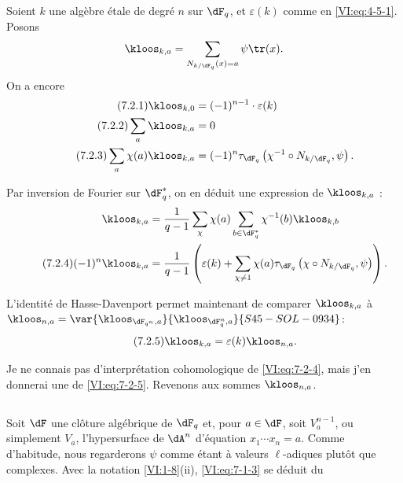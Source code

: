 Soient $k$ une algèbre étale de degré $n$ sur $\dF_q$, et $\varepsilon(k)$ 
comme en \eqref{VI:eq:4-5-1}. Posons 
\[
  \kloos_{k,a} = \sum_{N_{k/\dF_q}(x)=a} \psi \tr(x) \text{.} 
\]
On a encore 
\begin{align*}\tag{7.2.1}\label{VI:eq:7-2-1}
  \kloos_{k,0} &= (-1)^{n-1} \cdot \varepsilon(k) \\ \tag{7.2.2}\label{VI:eq:7-2-2}
  \sum_a \kloos_{k,a} &= 0 \\ \tag{7.2.3}\label{VI:eq:7-2-3}
  \sum_a \chi(a) \kloos_{k,a} &= (-1)^n \tau_{\dF_q}\left(\chi^{-1}\circ N_{k/\dF_q},\psi\right) \text{.} 
\end{align*}

Par inversion de Fourier sur $\dF_q^\ast$, on en déduit une expression de 
$\kloos_{k,a}$ : 
\begin{align*} 
  \kloos_{k,a} &= \frac{1}{q-1} \sum_\chi \chi(a) \sum_{b\in \dF_q^\ast} \chi^{-1}(b) \kloos_{k,b} \\ \tag{7.2.4}\label{VI:eq:7-2-4}
  (-1)^n \kloos_{k,a} &= \frac{1}{q-1} \left(\varepsilon(k) + \sum_{\chi\ne 1} \chi(a) \tau_{\dF_q}\left(\chi\circ N_{k/\dF_q},\psi\right) \right) \text{.} 
\end{align*}

L'identité de Hasse-Davenport permet maintenant de comparer $\kloos_{k,a}$ 
à $\kloos_{n,a} = \var{\kloos_{\dF_{q^n},a}}{\kloos_{\dF_q^n,a}}{S45-SOL-0934}$: 
\begin{equation*}\tag{7.2.5}\label{VI:eq:7-2-5}
  \kloos_{k,a} = \varepsilon(k) \kloos_{n,a} \text{.} 
\end{equation*}

Je ne connais pas d'interprétation cohomologique de \eqref{VI:eq:7-2-4}, mais 
j'en donnerai une de \eqref{VI:eq:7-2-5}. Revenons aux sommes $\kloos_{n,a}$. 





\subsection{}\label{VI:7-3}

Soit $\dF$ une clôture algébrique de $\dF_q$ et, pour $a\in \dF$, soit 
$V_a^{n-1}$, ou simplement $V_a$, l'hypersurface de $\dA^n$ d'équation 
$x_1 \dotsm x_n=a$. Comme d'habitude, nous regarderons $\psi$ comme étant à 
valeurs $\ell$-adiques plutôt que complexes. Avec la notation 
\ref{VI:1-8}(ii), \eqref{VI:eq:7-1-3} se déduit du 





